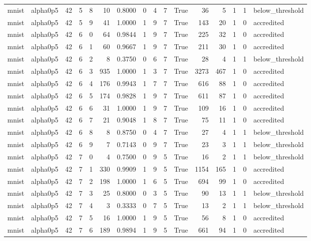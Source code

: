 \begin{tabular}{llrrrrrrrrrrrrrl}
mnist & alpha0p5 & 42 & 5 & 8 & 10 & 0.8000 & 0 & 4 & 7 & True & 36 & 5 & 1 & 1 & below\_threshold \\
mnist & alpha0p5 & 42 & 5 & 9 & 41 & 1.0000 & 1 & 9 & 7 & True & 143 & 20 & 1 & 0 & accredited \\
mnist & alpha0p5 & 42 & 6 & 0 & 64 & 0.9844 & 1 & 9 & 7 & True & 225 & 32 & 1 & 0 & accredited \\
mnist & alpha0p5 & 42 & 6 & 1 & 60 & 0.9667 & 1 & 9 & 7 & True & 211 & 30 & 1 & 0 & accredited \\
mnist & alpha0p5 & 42 & 6 & 2 & 8 & 0.3750 & 0 & 6 & 7 & True & 28 & 4 & 1 & 1 & below\_threshold \\
mnist & alpha0p5 & 42 & 6 & 3 & 935 & 1.0000 & 1 & 3 & 7 & True & 3273 & 467 & 1 & 0 & accredited \\
mnist & alpha0p5 & 42 & 6 & 4 & 176 & 0.9943 & 1 & 7 & 7 & True & 616 & 88 & 1 & 0 & accredited \\
mnist & alpha0p5 & 42 & 6 & 5 & 174 & 0.9828 & 1 & 9 & 7 & True & 611 & 87 & 1 & 0 & accredited \\
mnist & alpha0p5 & 42 & 6 & 6 & 31 & 1.0000 & 1 & 9 & 7 & True & 109 & 16 & 1 & 0 & accredited \\
mnist & alpha0p5 & 42 & 6 & 7 & 21 & 0.9048 & 1 & 8 & 7 & True & 75 & 11 & 1 & 0 & accredited \\
mnist & alpha0p5 & 42 & 6 & 8 & 8 & 0.8750 & 0 & 4 & 7 & True & 27 & 4 & 1 & 1 & below\_threshold \\
mnist & alpha0p5 & 42 & 6 & 9 & 7 & 0.7143 & 0 & 9 & 7 & True & 23 & 3 & 1 & 1 & below\_threshold \\
mnist & alpha0p5 & 42 & 7 & 0 & 4 & 0.7500 & 0 & 9 & 5 & True & 16 & 2 & 1 & 1 & below\_threshold \\
mnist & alpha0p5 & 42 & 7 & 1 & 330 & 0.9909 & 1 & 9 & 5 & True & 1154 & 165 & 1 & 0 & accredited \\
mnist & alpha0p5 & 42 & 7 & 2 & 198 & 1.0000 & 1 & 6 & 5 & True & 694 & 99 & 1 & 0 & accredited \\
mnist & alpha0p5 & 42 & 7 & 3 & 25 & 0.8000 & 0 & 3 & 5 & True & 90 & 13 & 1 & 1 & below\_threshold \\
mnist & alpha0p5 & 42 & 7 & 4 & 3 & 0.3333 & 0 & 7 & 5 & True & 13 & 2 & 1 & 1 & below\_threshold \\
mnist & alpha0p5 & 42 & 7 & 5 & 16 & 1.0000 & 1 & 9 & 5 & True & 56 & 8 & 1 & 0 & accredited \\
mnist & alpha0p5 & 42 & 7 & 6 & 189 & 0.9894 & 1 & 9 & 5 & True & 661 & 94 & 1 & 0 & accredited \\

\end{tabular}
